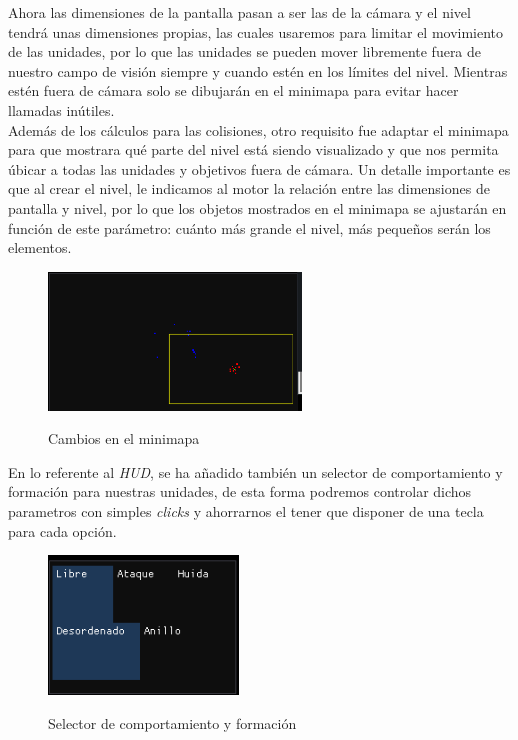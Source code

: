 Ahora las dimensiones de la pantalla pasan a ser las de la cámara y el nivel tendrá unas dimensiones
propias, las cuales usaremos para limitar el movimiento de las unidades, por lo que las unidades se pueden
mover libremente fuera de nuestro campo de visión siempre y cuando estén en los límites del nivel.
Mientras estén fuera de cámara solo se dibujarán en el minimapa para evitar hacer llamadas inútiles. \\
Además de los cálculos para las colisiones, otro requisito fue adaptar el minimapa para que mostrara
qué parte del nivel está siendo visualizado y que nos permita úbicar a todas las unidades y objetivos
fuera de cámara. Un detalle importante es que al crear el nivel, le indicamos al motor la relación
entre las dimensiones de pantalla y nivel, por lo que los objetos mostrados en el minimapa se ajustarán
en función de este parámetro: cuánto más grande el nivel, más pequeños serán los elementos.

\begin{figure}[ht]
\centering
\includegraphics[width=0.6\textwidth]{imagenes/diario_desarrollo/minimap2.png}\\
\caption{Cambios en el minimapa}
\label{fig:minimap2}
\end{figure}

En lo referente al \textit{HUD}, se ha añadido también un selector de comportamiento y formación
para nuestras unidades, de esta forma podremos controlar dichos parametros con simples \textit{clicks}
y ahorrarnos el tener que disponer de una tecla para cada opción. 

\begin{figure}[ht]
\centering
\includegraphics[width=0.45\textwidth]{imagenes/diario_desarrollo/eleccion_b.png}\\
\caption{Selector de comportamiento y formación}
\label{fig:hud_selec}
\end{figure}

